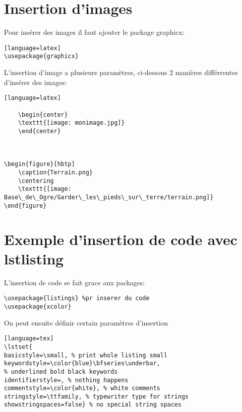\section{Insertion d'images}
Pour ins\'erer des images il faut ajouter le package graphicx:

\begin{lstlisting}[caption={Ajout du packqge pour l'insertion d'image}][language=latex]
\usepackage{graphicx}
\end{lstlisting}

L'insertion d'image a plusieurs param\`etres, ci-dessous 2 mani\`eres diff\'errentes d'ins\'erer des images:

\begin{lstlisting}[caption={Insertion d'image}][language=latex]

	\begin{center}
	\texttt{[image: monimage.jpg]} 
	\end{center}



\begin{figure}[hbtp]
    \caption{Terrain.png}
    \centering
    \texttt{[image: Base\_de\_Ogre/Garder\_les\_pieds\_sur\_terre/terrain.png]}
\end{figure}
\end{lstlisting}






\section{Exemple d'insertion de code avec lstlisting}
L'insertion de code se fait grace aux packages:

\begin{lstlisting}
\usepackage{listings} %pr inserer du code
\usepackage{xcolor}
\end{lstlisting}

On peut ensuite d\'efinir certain param\`etres d'insertion
\begin{lstlisting}[caption={Commande pour sp\'ecifier les param\`etres d'insertion de code}] [language=tex]
\lstset{
basicstyle=\small, % print whole listing small
keywordstyle=\color{blue}\bfseries\underbar,
% underlined bold black keywords
identifierstyle=, % nothing happens
commentstyle=\color{white}, % white comments
stringstyle=\ttfamily, % typewriter type for strings
showstringspaces=false} % no special string spaces
\end{lstlisting}


